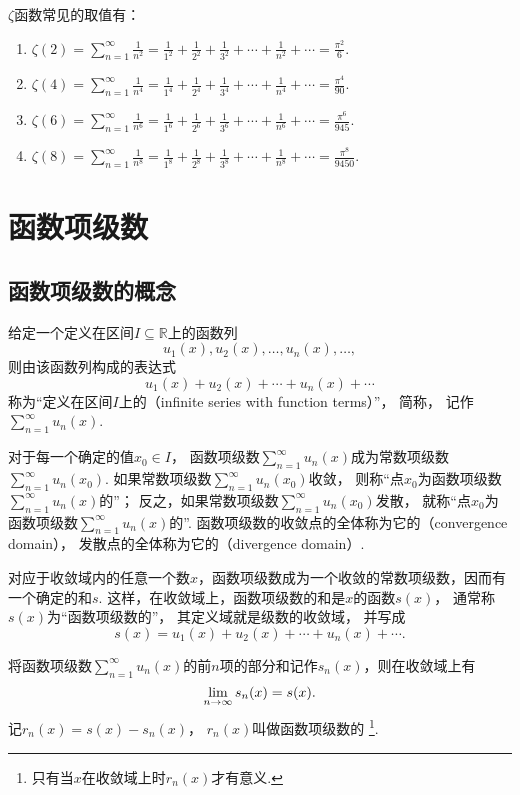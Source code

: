\begin{property}
\def\zetafunc#1{\zeta(#1)
= \sum\limits_{n=1}^\infty \frac{1}{n^{#1}}
= \frac{1}{1^{#1}}+\frac{1}{2^{#1}}+\frac{1}{3^{#1}}+\dotsb+\frac{1}{n^{#1}}+\dotsb}
\(\zeta\)函数常见的取值有：\begin{enumerate}
	\item \(\zetafunc{2} = \frac{\pi^2}{6}\).
	\item \(\zetafunc{4} = \frac{\pi^4}{90}\).
	\item \(\zetafunc{6} = \frac{\pi^6}{945}\).
	\item \(\zetafunc{8} = \frac{\pi^8}{9450}\).
\end{enumerate}
\end{property}

\section{函数项级数}
\subsection{函数项级数的概念}
\begin{definition}\label{definition:无穷级数.实函数项级数的概念}
给定一个定义在区间\(I \subseteq \mathbb{R}\)上的函数列\[
u_1(x),u_2(x),\dotsc,u_n(x),\dotsc,
\]
则由该函数列构成的表达式\[
u_1(x)+u_2(x)+\dotsb+u_n(x)+\dotsb
\]
称为“定义在区间\(I\)上的（infinite series with function terms）”，
简称，
记作\(\sum\limits_{n=1}^\infty u_n(x)\).

对于每一个确定的值\(x_0 \in I\)，
函数项级数\(\sum\limits_{n=1}^\infty u_n(x)\)成为常数项级数\(\sum\limits_{n=1}^\infty u_n(x_0)\).
如果常数项级数\(\sum\limits_{n=1}^\infty u_n(x_0)\)收敛，
则称“点\(x_0\)为函数项级数\(\sum\limits_{n=1}^\infty u_n(x)\)的”；
反之，如果常数项级数\(\sum\limits_{n=1}^\infty u_n(x_0)\)发散，
就称“点\(x_0\)为函数项级数\(\sum\limits_{n=1}^\infty u_n(x)\)的”.
函数项级数的收敛点的全体称为它的（convergence domain），
发散点的全体称为它的（divergence domain）.

对应于收敛域内的任意一个数\(x\)，函数项级数成为一个收敛的常数项级数，因而有一个确定的和\(s\).
这样，在收敛域上，函数项级数的和是\(x\)的函数\(s(x)\)，
通常称\(s(x)\)为“函数项级数的”，
其定义域就是级数的收敛域，
并写成\[
s(x) = u_1(x)+u_2(x)+\dotsb+u_n(x)+\dotsb.
\]

将函数项级数\(\sum\limits_{n=1}^\infty u_n(x)\)的前\(n\)项的部分和记作\(s_n(x)\)，则在收敛域上有\[
\lim\limits_{n\to\infty} s_n(x) = s(x).
\]
记\(r_n(x) = s(x)-s_n(x)\)，
\(r_n(x)\)叫做函数项级数的%
\footnote{只有当\(x\)在收敛域上时\(r_n(x)\)才有意义.}.
\end{definition}

